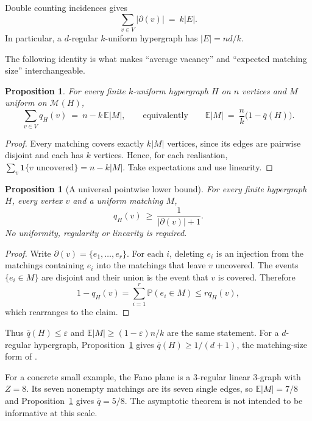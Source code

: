 \documentclass[11pt,a4paper]{amsart}
\theoremstyle{plain}
\newtheorem{proposition}[theorem]{Proposition}
\theoremstyle{definition}
\theoremstyle{remark}
\newcommand{\VV}{V}
\newcommand{\EE}{E}
\newcommand{\Mat}{\mathcal{M}}
\newcommand{\PP}{\mathbb{P}}
\newcommand{\EX}{\mathbb{E}}
\newcommand{\qbar}{\overline{q}}
\newcommand{\dg}{\partial}
\begin{document}
Double counting incidences gives
\begin{equation}
\label{eq:edgecount}
  \sum_{v\in\VV}|\dg(v)|\ =\ k|\EE|.
\end{equation}
In particular, a $d$-regular $k$-uniform hypergraph has $|\EE|=nd/k$.

The following identity is what makes ``average vacancy'' and ``expected matching size''
interchangeable.

\begin{proposition}
\label{prop:avgid}
For every finite $k$-uniform hypergraph $H$ on $n$ vertices and $M$ uniform on
$\Mat(H)$,
\[
  \sum_{v\in \VV} q_H(v)\ =\ n-k\,\EX|M|,
  \qquad\text{equivalently}\qquad
  \EX|M|\ =\ \frac{n}{k}\bigl(1-\qbar(H)\bigr).
\]
\end{proposition}

\begin{proof}
Every matching covers exactly $k|M|$ vertices, since its edges are pairwise disjoint and
each has $k$ vertices. Hence, for each realisation,
$\sum_{v}\mathbf{1}\{v\text{ uncovered}\}=n-k|M|$. Take expectations and use linearity.
\end{proof}

\begin{proposition}[A universal pointwise lower bound]
\label{prop:pointlower}
For every finite hypergraph $H$, every vertex $v$ and a uniform matching $M$,
\[
  q_H(v)\ \ge\ \frac1{|\dg(v)|+1}.
\]
No uniformity, regularity or linearity is required.
\end{proposition}

\begin{proof}
Write $\dg(v)=\{e_1,\ldots,e_r\}$. For each $i$, deleting $e_i$ is an injection from
the matchings containing $e_i$ into the matchings that leave $v$ uncovered. The events
$\{e_i\in M\}$ are disjoint and their union is the event that $v$ is covered. Therefore
\[
  1-q_H(v)=\sum_{i=1}^r\PP(e_i\in M)\le r q_H(v),
\]
which rearranges to the claim.
\end{proof}

Thus $\qbar(H)\le\varepsilon$ and $\EX|M|\ge(1-\varepsilon)n/k$ are the same statement.
For a $d$-regular hypergraph, Proposition~\ref{prop:pointlower} gives
$\qbar(H)\ge1/(d+1)$, the matching-size form of \cite[Corollary 5.1]{Lee}.

For a concrete small example, the Fano plane is a $3$-regular linear $3$-graph with
$Z=8$. Its seven nonempty matchings are its seven single edges, so
$\EX|M|=7/8$ and Proposition~\ref{prop:avgid} gives $\qbar=5/8$. The asymptotic theorem
is not intended to be informative at this scale.
\end{document}

